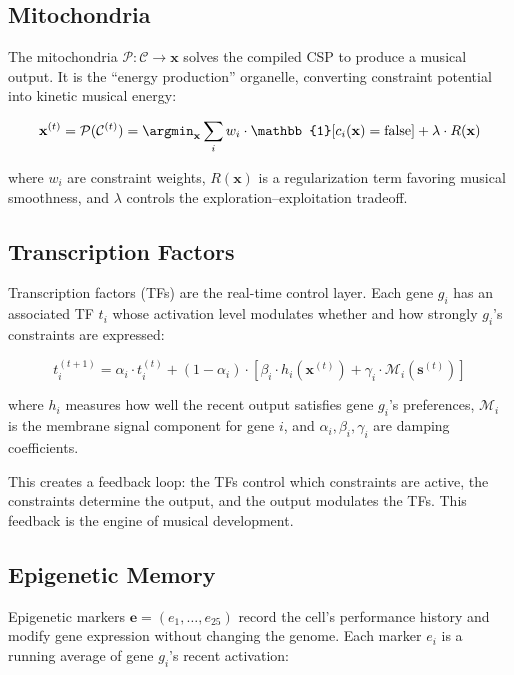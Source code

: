 \documentclass[11pt,a4paper]{article}
\newcommand{\calC}{\mathcal{C}}
\begin{document}
\subsection{Mitochondria}

The mitochondria $\mathcal{P}: \calC \to \mathbf{x}$ solves the compiled CSP to produce a musical output. It is the ``energy production'' organelle, converting constraint potential into kinetic musical energy:

\begin{equation}
  \mathbf{x}^{(t)} = \mathcal{P}(\calC^{(t)}) = \argmin_{\mathbf{x}} \sum_{i} w_i \cdot \mathbb{1}[c_i(\mathbf{x}) = \text{false}] + \lambda \cdot R(\mathbf{x})
\end{equation}

where $w_i$ are constraint weights, $R(\mathbf{x})$ is a regularization term favoring musical smoothness, and $\lambda$ controls the exploration--exploitation tradeoff.

\subsection{Transcription Factors}\label{sec:tfs}

Transcription factors (TFs) are the real-time control layer. Each gene $g_i$ has an associated TF $t_i$ whose activation level modulates whether and how strongly $g_i$'s constraints are expressed:

\begin{equation}
  t_i^{(t+1)} = \alpha_i \cdot t_i^{(t)} + (1 - \alpha_i) \cdot \left[ \beta_i \cdot h_i(\mathbf{x}^{(t)}) + \gamma_i \cdot \mathcal{M}_i(\mathbf{s}^{(t)}) \right]
\end{equation}

where $h_i$ measures how well the recent output satisfies gene $g_i$'s preferences, $\mathcal{M}_i$ is the membrane signal component for gene $i$, and $\alpha_i, \beta_i, \gamma_i$ are damping coefficients.

This creates a feedback loop: the TFs control which constraints are active, the constraints determine the output, and the output modulates the TFs. This feedback is the engine of musical development.

\subsection{Epigenetic Memory}\label{sec:epigenetics}

Epigenetic markers $\mathbf{e} = (e_1, \ldots, e_{25})$ record the cell's performance history and modify gene expression without changing the genome. Each marker $e_i$ is a running average of gene $g_i$'s recent activation:
\end{document}

